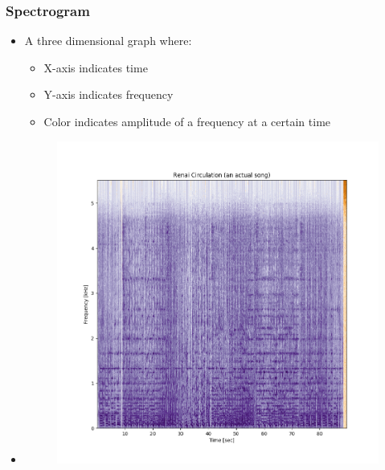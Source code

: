 \documentclass{beamer}
\begin{document}
\begin{frame}
    \frametitle{Spectrogram}
    \begin{itemize}
        \item A three dimensional graph where:
        \begin{itemize}
            \item X-axis indicates time
            \item Y-axis indicates frequency
            \item Color indicates amplitude of a frequency at a certain time
        \end{itemize}
        \item \begin{figure}
                \includegraphics{Spectrogram_Specimens/ActualSong.png}
              \end{figure}
    \end{itemize}
\end{frame}
\end{document}
